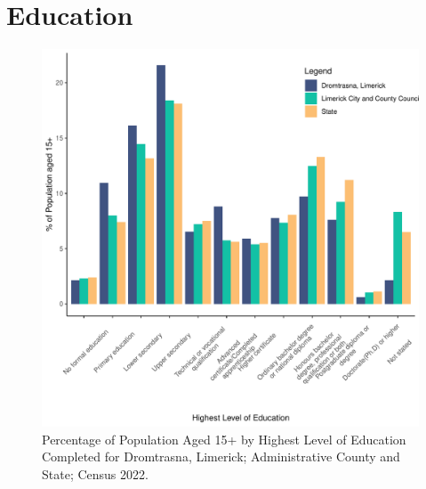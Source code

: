 \documentclass{article}
\begin{document}
\section{Education}\label{sect:Edu}
\begin{figure}[H]
	\centering
	\includegraphics[width = 120mm]{../figures/EduED.pdf}
	\caption{Percentage of Population Aged 15+ by Highest Level of Education Completed for Dromtrasna, Limerick; Administrative County and State; Census 2022.}
	\label{fig:vbnv}
	\end{figure}
\end{document}
